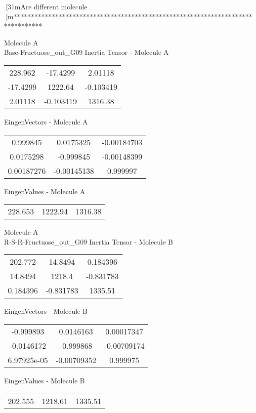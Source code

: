 [31mAre different molecule
[m********************************************************************************
\newpage
\begin{multicols}{2}
\begin{center}
Molecule A \\ 
Base-Fructuose_out_G09
Inertia Tensor - Molecule A \\
\vtab
\begin{tabular}{|c c c|}
228.962	 & 	-17.4299	 & 	2.01118	 \\
-17.4299	 & 	1222.64	 & 	-0.103419	 \\
2.01118	 & 	-0.103419	 & 	1316.38
\end{tabular}

\vtab
 EingenVectors - Molecule A     \\
\vtab
\begin{tabular}{|c c c|}
0.999845	 & 	0.0175325	 & 	-0.00184703	 \\
0.0175298	 & 	-0.999845	 & 	-0.00148399	 \\
0.00187276	 & 	-0.00145138	 & 	0.999997
\end{tabular}

\vtab
 EingenValues - Molecule A     \\
\vtab
\begin{tabular}{|c c c|}
228.653	 & 	1222.94	 & 	1316.38
\end{tabular}
\columnbreak
Molecule A \\ 
R-S-R-Fructuose_out_G09
Inertia Tensor - Molecule B \\
\vtab
\begin{tabular}{|c c c|}
202.772	 & 	14.8494	 & 	0.184396	 \\
14.8494	 & 	1218.4	 & 	-0.831783	 \\
0.184396	 & 	-0.831783	 & 	1335.51
\end{tabular}

\vtab
 EingenVectors - Molecule B     \\
\vtab
\begin{tabular}{|c c c|}
-0.999893	 & 	0.0146163	 & 	0.00017347	 \\
-0.0146172	 & 	-0.999868	 & 	-0.00709174	 \\
6.97925e-05	 & 	-0.00709352	 & 	0.999975
\end{tabular}

\vtab
 EingenValues - Molecule B     \\
\vtab
\begin{tabular}{|c c c|}
202.555	 & 	1218.61	 & 	1335.51
\end{tabular}
\end{center}
\end{multicols}
